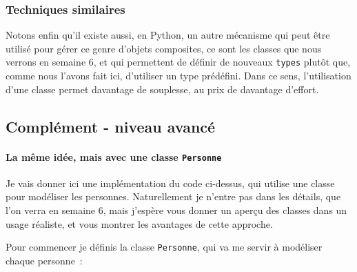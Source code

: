     \hypertarget{techniques-similaires}{%
\subsubsection{Techniques similaires}\label{techniques-similaires}}

    Notons enfin qu'il existe aussi, en Python, un autre mécanisme qui peut
être utilisé pour gérer ce genre d'objets composites, ce sont les
classes que nous verrons en semaine 6, et qui permettent de définir de
nouveaux \texttt{types} plutôt que, comme nous l'avons fait ici,
d'utiliser un type prédéfini. Dans ce sens, l'utilisation d'une classe
permet davantage de souplesse, au prix de davantage d'effort.

    \hypertarget{compluxe9ment---niveau-avancuxe9}{%
\subsection{Complément - niveau
avancé}\label{compluxe9ment---niveau-avancuxe9}}

    \hypertarget{la-muxeame-iduxe9e-mais-avec-une-classe-personne}{%
\paragraph{\texorpdfstring{La même idée, mais avec une classe
\texttt{Personne}}{La même idée, mais avec une classe Personne}}\label{la-muxeame-iduxe9e-mais-avec-une-classe-personne}}

    Je vais donner ici une implémentation du code ci-dessus, qui utilise une
classe pour modéliser les personnes. Naturellement je n'entre pas dans
les détails, que l'on verra en semaine 6, mais j'espère vous donner un
aperçu des classes dans un usage réaliste, et vous montrer les avantages
de cette approche.

    Pour commencer je définis la classe \texttt{Personne}, qui va me servir
à modéliser chaque personne~:

